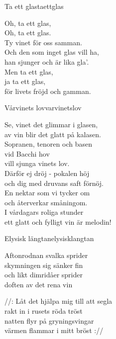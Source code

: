\begin{song}{Ta ett glas}{taettglas}

\begin{vers}
Oh, ta ett glas,\\
Oh, ta ett glas.\\
Ty vinet för oss samman.\\
Och den som inget glas vill ha,\\
han sjunger och är lika gla'.\\
Men ta ett glas,\\
ja ta ett glas,\\
för livets fröjd och gamman.\\
\end{vers}
\end{song}

\newpage

\begin{song}{Vårvinets lov}{varvinetslov}

\begin{vers}
Se, vinet det glimmar i glasen,\\
av vin blir det glatt på kalasen.\\
Sopranen, tenoren och basen\\
vid Bacchi hov\\
vill sjunga vinets lov.\\
Därför ej dröj - pokalen höj\\
och dig med druvans saft förnöj.\\
En nektar som vi tycker om\\
och återverkar småningom.\\
I vårdagars roliga stunder\\
ett glatt och fylligt vin är melodin!\\ 
\end{vers}
\end{song}

\begin{song}{Elysisk längtan}{elysisklangtan}
\begin{vers}
Aftonrodnan svalka sprider\\
skymningen sig sänker fin\\
och likt dimridåer sprider\\
doften av det rena vin\\
\end{vers}
\begin{vers}
//: Låt det hjälpa mig till att segla\\
rakt in i rusets röda tröst\\
natten flyr på gryningsvingar\\
värmen flammar i mitt bröst ://\\
\end{vers} 
\end{song}

